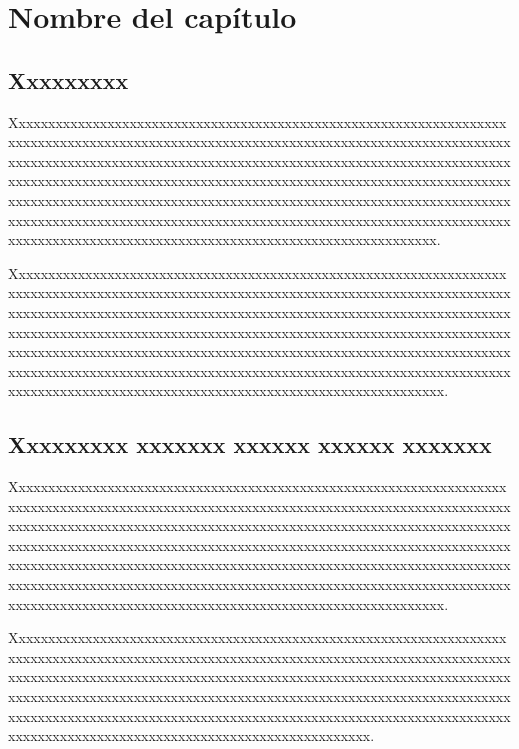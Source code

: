 \chapter{Nombre del capítulo}

\section{Xxxxxxxxx}

Xxxxxxxxxxxxxxxxxxxxxxxxxxxxxxxxxxxxxxxxxxxxxxxxxxxxxxxxxxxxxxxxxxxxxxxxxxxxxxxxxxxxxxxxxxxxxxxxxxxxxxxxxxxxxxxxxxxxxxxxxxxxxxxxxxxxxxxxxxxxxxxxxxxxxxxxxxxxxxxxxxxxxxxxxxxxxxxxxxxxxxxxxxxxxxxxxxxxxxxxxxxxxxxxxxxxxxxxxxxxxxxxxxxxxxxxxxxxxxxxxxxxxxxxxxxxxxxxxxxxxxxxxxxxxxxxxxxxxxxxxxxxxxxxxxxxxxxxxxxxxxxxxxxxxxxxxxxxxxxxxxxxxxxxxxxxxxxxxxxxxxxxxxxxxxxxxxxxxxxxxxxxxxxxxxxxxxxxxxxxxxxxxxxxxxxxxxxxxxxxxxxxxxxxxxxxxxxxxxxxxxxxxxxxxxxxxxxxxxxxxxxxxxxxxxxxxxxxxxxxxxxxx.

Xxxxxxxxxxxxxxxxxxxxxxxxxxxxxxxxxxxxxxxxxxxxxxxxxxxxxxxxxxxxxxxxxxxxxxxxxxxxxxxxxxxxxxxxxxxxxxxxxxxxxxxxxxxxxxxxxxxxxxxxxxxxxxxxxxxxxxxxxxxxxxxxxxxxxxxxxxxxxxxxxxxxxxxxxxxxxxxxxxxxxxxxxxxxxxxxxxxxxxxxxxxxxxxxxxxxxxxxxxxxxxxxxxxxxxxxxxxxxxxxxxxxxxxxxxxxxxxxxxxxxxxxxxxxxxxxxxxxxxxxxxxxxxxxxxxxxxxxxxxxxxxxxxxxxxxxxxxxxxxxxxxxxxxxxxxxxxxxxxxxxxxxxxxxxxxxxxxxxxxxxxxxxxxxxxxxxxxxxxxxxxxxxxxxxxxxxxxxxxxxxxxxxxxxxxxxxxxxxxxxxxxxxxxxxxxxxxxxxxxxxxxxxxxxxxxxxxxxxxxxxxxxxx.

\section{Xxxxxxxxx xxxxxxx xxxxxx xxxxxx xxxxxxx}

Xxxxxxxxxxxxxxxxxxxxxxxxxxxxxxxxxxxxxxxxxxxxxxxxxxxxxxxxxxxxxxxxxxxxxxxxxxxxxxxxxxxxxxxxxxxxxxxxxxxxxxxxxxxxxxxxxxxxxxxxxxxxxxxxxxxxxxxxxxxxxxxxxxxxxxxxxxxxxxxxxxxxxxxxxxxxxxxxxxxxxxxxxxxxxxxxxxxxxxxxxxxxxxxxxxxxxxxxxxxxxxxxxxxxxxxxxxxxxxxxxxxxxxxxxxxxxxxxxxxxxxxxxxxxxxxxxxxxxxxxxxxxxxxxxxxxxxxxxxxxxxxxxxxxxxxxxxxxxxxxxxxxxxxxxxxxxxxxxxxxxxxxxxxxxxxxxxxxxxxxxxxxxxxxxxxxxxxxxxxxxxxxxxxxxxxxxxxxxxxxxxxxxxxxxxxxxxxxxxxxxxxxxxxxxxxxxxxxxxxxxxxxxxxxxxxxxxxxxxxxxxxxxx.

Xxxxxxxxxxxxxxxxxxxxxxxxxxxxxxxxxxxxxxxxxxxxxxxxxxxxxxxxxxxxxxxxxxxxxxxxxxxxxxxxxxxxxxxxxxxxxxxxxxxxxxxxxxxxxxxxxxxxxxxxxxxxxxxxxxxxxxxxxxxxxxxxxxxxxxxxxxxxxxxxxxxxxxxxxxxxxxxxxxxxxxxxxxxxxxxxxxxxxxxxxxxxxxxxxxxxxxxxxxxxxxxxxxxxxxxxxxxxxxxxxxxxxxxxxxxxxxxxxxxxxxxxxxxxxxxxxxxxxxxxxxxxxxxxxxxxxxxxxxxxxxxxxxxxxxxxxxxxxxxxxxxxxxxxxxxxxxxxxxxxxxxxxxxxxxxxxxxxxxxxxxxxxxxxxxxxxxxxxxxxxxxxxxxx.